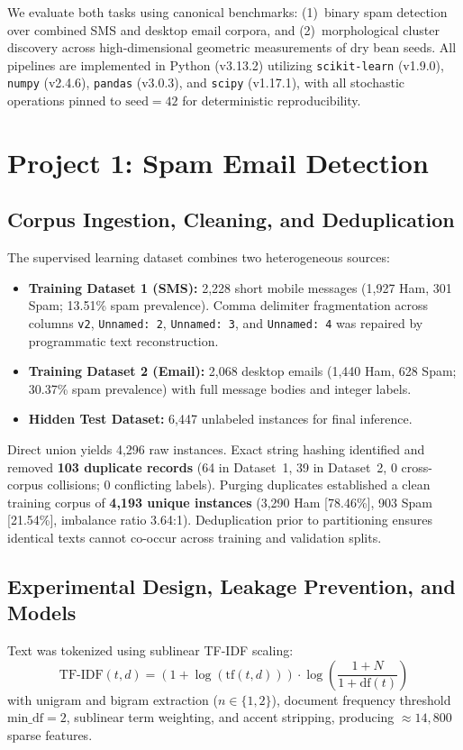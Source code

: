 \documentclass[10pt,onecolumn,letterpaper]{article}
\begin{document}
We evaluate both tasks using canonical benchmarks: (1)~binary spam detection over combined SMS and desktop email corpora, and (2)~morphological cluster discovery across high-dimensional geometric measurements of dry bean seeds. All pipelines are implemented in Python (v3.13.2) utilizing \texttt{scikit-learn} (v1.9.0), \texttt{numpy} (v2.4.6), \texttt{pandas} (v3.0.3), and \texttt{scipy} (v1.17.1), with all stochastic operations pinned to $\text{seed}=42$ for deterministic reproducibility.

\section{Project 1: Spam Email Detection}

\subsection{Corpus Ingestion, Cleaning, and Deduplication}
The supervised learning dataset combines two heterogeneous sources:
\begin{itemize}
  \item \textbf{Training Dataset 1 (SMS):} 2,228 short mobile messages (1,927 Ham, 301 Spam; 13.51\% spam prevalence). Comma delimiter fragmentation across columns \texttt{v2}, \texttt{Unnamed: 2}, \texttt{Unnamed: 3}, and \texttt{Unnamed: 4} was repaired by programmatic text reconstruction.
  \item \textbf{Training Dataset 2 (Email):} 2,068 desktop emails (1,440 Ham, 628 Spam; 30.37\% spam prevalence) with full message bodies and integer labels.
  \item \textbf{Hidden Test Dataset:} 6,447 unlabeled instances for final inference.
\end{itemize}

Direct union yields 4,296 raw instances. Exact string hashing identified and removed \textbf{103 duplicate records} (64 in Dataset~1, 39 in Dataset~2, 0 cross-corpus collisions; 0 conflicting labels). Purging duplicates established a clean training corpus of \textbf{4,193 unique instances} (3,290 Ham [78.46\%], 903 Spam [21.54\%], imbalance ratio 3.64:1). Deduplication prior to partitioning ensures identical texts cannot co-occur across training and validation splits.

\subsection{Experimental Design, Leakage Prevention, and Models}
Text was tokenized using sublinear TF-IDF scaling:
\begin{equation}
\text{TF-IDF}(t, d) = \left(1 + \log(\text{tf}(t, d))\right) \cdot \log\left(\frac{1 + N}{1 + \text{df}(t)}\right)
\end{equation}
with unigram and bigram extraction ($n \in \{1, 2\}$), document frequency threshold $\text{min\_df}=2$, sublinear term weighting, and accent stripping, producing $\approx 14,800$ sparse features.
\end{document}
